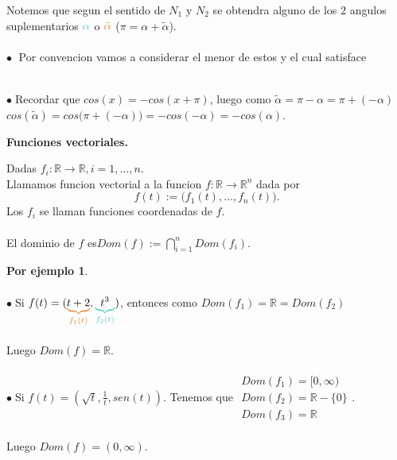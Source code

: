 \documentclass{article}
\theoremstyle{definition}
\newtheorem*{ej}{Por ejemplo}
\theoremstyle{remark}
\newcommand\bl{$\bullet\;$}
\begin{document}
\begin{figure}[h]
\centering
\def\svgwidth{1\textwidth}

\end{figure}
Notemos que segun el sentido de $N_1$ y $N_2$ se obtendra alguno de los $2$ angulos suplementarios $\textcolor{verdep2}{\alpha}$ o $\textcolor{rojop2}{\tilde{\alpha}}$ \big($\pi = \alpha + \tilde{\alpha}$\big).
\\\\ \textcolor{rojop2}{\bl} Por convencion vamos a considerar el menor de estos y el cual satisface \\
\begin{figure}[h]
\centering
\def\svgwidth{1\textwidth}

\end{figure} \\
\bl Recordar que $cos(x)=-cos(x+\pi)$, luego como $\tilde{\alpha}=\pi-\alpha=\pi+(-\alpha)$ \\ $cos(\tilde{\alpha})=cos\big(\pi+(-\alpha)\big)=-cos(-\alpha)=-cos(\alpha)$. 
\pagebreak
\begin{center}
\textbf{Funciones vectoriales.}
\end{center}
\begin{defi}
  Dadas $f_i : \mathbb{R} \to \mathbb{R}, i=1,\dots, n$.\\Llamamos funcion vectorial a la funcion $f: \mathbb{R} \to \mathbb{R}^n$ dada por $$f(t) := \big(f_1(t),\dots, f_n(t)\big).$$ Los $f_i$ se llaman funciones coordenadas de $f$. \\\\ El dominio de $f$ es\quad \quad  $    Dom(f) := \bigcap_{i=1}^{n} Dom(f_i)$.
\end{defi}
\begin{ej}
\; \\
\\ \bl Si $f(t)=(\textcolor{rojop2}{\underbrace{\textcolor{black}{t+2}}_{f_1(t)}},\textcolor{verdep2}{\underbrace{\textcolor{black}{t^3}}_{f_2(t)}})$, entonces como $Dom(f_1)=\mathbb{R}=Dom(f_2)$ \\ \\ Luego \quad $Dom(f)=\mathbb{R}$. \\\\
\bl Si $f(t)=\left(\sqrt{t},\frac{1}{t},sen(t)\right)$. Tenemos que $\begin{array}{l}Dom(f_1)=[0,\infty) \\ Dom(f_2)=\mathbb{R}-\{0\}\\ Dom(f_3)=\mathbb{R}\end{array}$.\\\\ Luego $Dom(f)=(0,\infty)$.

\end{ej}
\end{document}
